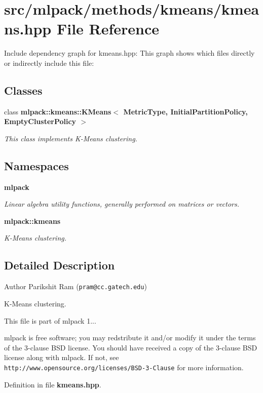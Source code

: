 \section{src/mlpack/methods/kmeans/kmeans.hpp File Reference}
\label{kmeans_8hpp}
Include dependency graph for kmeans.\-hpp\-:
This graph shows which files directly or indirectly include this file\-:
\subsection*{Classes}
\begin{DoxyCompactItemize}
\item 
class {\bf mlpack\-::kmeans\-::\-K\-Means$<$ Metric\-Type, Initial\-Partition\-Policy, Empty\-Cluster\-Policy $>$}
\begin{DoxyCompactList}\small\item\em This class implements K-\/\-Means clustering. \end{DoxyCompactList}\end{DoxyCompactItemize}
\subsection*{Namespaces}
\begin{DoxyCompactItemize}
\item 
{\bf mlpack}
\begin{DoxyCompactList}\small\item\em Linear algebra utility functions, generally performed on matrices or vectors. \end{DoxyCompactList}\item 
{\bf mlpack\-::kmeans}
\begin{DoxyCompactList}\small\item\em K-\/\-Means clustering. \end{DoxyCompactList}\end{DoxyCompactItemize}


\subsection{Detailed Description}
\begin{DoxyAuthor}{Author}
Parikshit Ram ({\tt pram@cc.\-gatech.\-edu})
\end{DoxyAuthor}
K-\/\-Means clustering.

This file is part of mlpack 1...

mlpack is free software; you may redstribute it and/or modify it under the terms of the 3-\/clause B\-S\-D license. You should have received a copy of the 3-\/clause B\-S\-D license along with mlpack. If not, see {\tt http\-://www.\-opensource.\-org/licenses/\-B\-S\-D-\/3-\/\-Clause} for more information. 

Definition in file {\bf kmeans.\-hpp}.

